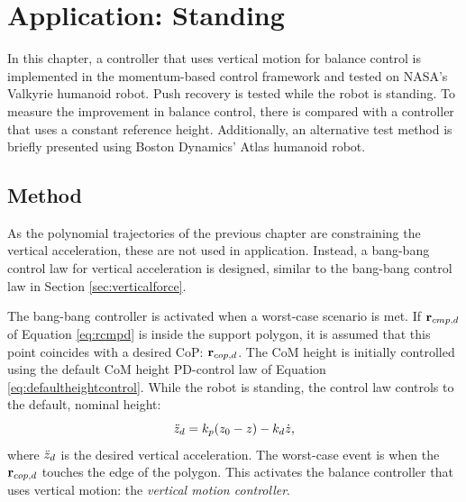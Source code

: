\chapter{Application: Standing}\label{chap:standing}
In this chapter, a controller that uses vertical motion for balance control is implemented in the momentum-based control framework and tested on NASA's Valkyrie \cite{radford2015valkyrie} humanoid robot. Push recovery is tested while the robot is standing. To measure the improvement in balance control, there is compared with a controller that uses a constant reference height. Additionally, an alternative test method is briefly presented using Boston Dynamics' Atlas humanoid robot.

\section{Method}
As the polynomial trajectories of the previous chapter are constraining the vertical acceleration, these are not used in application. Instead, a bang-bang control law for vertical acceleration is designed, similar to the bang-bang control law in Section \ref{sec:verticalforce}.

The bang-bang controller is activated when a worst-case scenario is met. If $\mathbf{r}_{cmp,d}$ of Equation \ref{eq:rcmpd} is inside the support polygon, it is assumed that this point coincides with a desired \ac{CoP}: $\mathbf{r}_{cop,d}$. The \ac{CoM} height is initially controlled using the default \ac{CoM} height PD-control law of Equation \ref{eq:defaultheightcontrol}.  While the robot is standing, the control law controls to the default, nominal height:
\begin{equation}
\ddot{z}_d =k_p(z_0-z) - k_d\dot{z},
\end{equation}
where $\ddot{z}_d$ is the desired vertical acceleration. The worst-case event is when the $\mathbf{r}_{cop,d}$ touches the edge of the polygon. This activates the balance controller that uses vertical motion: the \textit{vertical motion controller}. 

